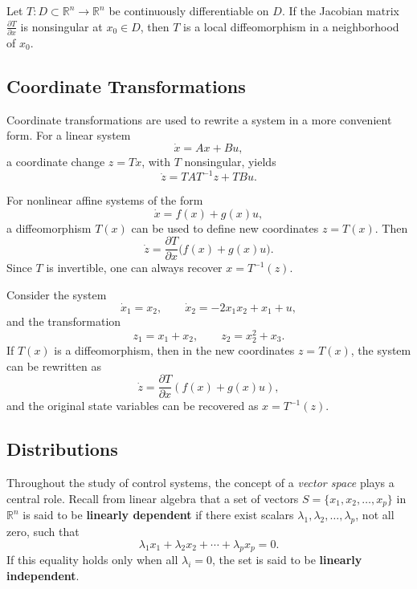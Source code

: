 \begin{lemma}\label{lem:inverse_function}
Let $T : D \subset \mathbb{R}^n \to \mathbb{R}^n$ be continuously differentiable on $D$.  
If the Jacobian matrix $\frac{\partial T}{\partial x}$ is nonsingular at $x_0 \in D$,  
then $T$ is a local diffeomorphism in a neighborhood of $x_0$.
\end{lemma}

\subsection{Coordinate Transformations}

Coordinate transformations are used to rewrite a system in a more convenient form.  
For a linear system
\[
\dot{x} = A x + B u,
\]
a coordinate change $z = T x$, with $T$ nonsingular, yields
\[
\dot{z} = T A T^{-1} z + T B u.
\]

For nonlinear affine systems of the form
\[
\dot{x} = f(x) + g(x) u,
\]
a diffeomorphism $T(x)$ can be used to define new coordinates $z = T(x)$.  
Then
\[
\dot{z} = \frac{\partial T}{\partial x} \big( f(x) + g(x)u \big).
\]
Since $T$ is invertible, one can always recover $x = T^{-1}(z)$.

\begin{example}
Consider the system
\[
\dot{x}_1 = x_2, 
\qquad 
\dot{x}_2 = -2x_1 x_2 + x_1 + u,
\]
and the transformation
\[
z_1 = x_1 + x_2, 
\qquad 
z_2 = x_2^2 + x_3.
\]
If $T(x)$ is a diffeomorphism, then in the new coordinates $z = T(x)$, 
the system can be rewritten as
\[
\dot{z} = \frac{\partial T}{\partial x} (f(x) + g(x)u),
\]
and the original state variables can be recovered as $x = T^{-1}(z)$.
\end{example}

\subsection{Distributions}

Throughout the study of control systems, the concept of a \emph{vector space} plays a central role.  
Recall from linear algebra that a set of vectors 
$S = \{x_1, x_2, \ldots, x_p\}$ in $\mathbb{R}^n$ is said to be \textbf{linearly dependent}  
if there exist scalars $\lambda_1, \lambda_2, \ldots, \lambda_p$, not all zero, such that
\[
\lambda_1 x_1 + \lambda_2 x_2 + \cdots + \lambda_p x_p = 0.
\]
If this equality holds only when all $\lambda_i = 0$, the set is said to be \textbf{linearly independent}.

